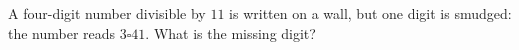 A four-digit number divisible by $11$ is written on a wall, but one digit is smudged: the number reads $3\square41$. What is the missing digit?
